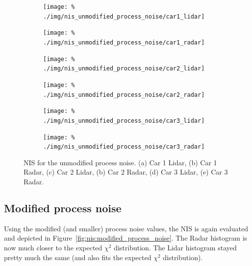 \documentclass{scrartcl}
\begin{document}
\begin{figure}[!ht]
	\centering
	\begin{subfigure}[c]{0.45\columnwidth}
		\texttt{[image: \%
			./img/nis\_unmodified\_process\_noise/car1\_lidar]}
	\end{subfigure}
	\begin{subfigure}[c]{0.45\columnwidth}
		\texttt{[image: \%
			./img/nis\_unmodified\_process\_noise/car1\_radar]}
	\end{subfigure}
	\begin{subfigure}[c]{0.45\columnwidth}
		\texttt{[image: \%
			./img/nis\_unmodified\_process\_noise/car2\_lidar]}
	\end{subfigure}
	\begin{subfigure}[c]{0.45\columnwidth}
		\texttt{[image: \%
			./img/nis\_unmodified\_process\_noise/car2\_radar]}
	\end{subfigure}
	\begin{subfigure}[c]{0.45\columnwidth}
		\texttt{[image: \%
			./img/nis\_unmodified\_process\_noise/car3\_lidar]}
	\end{subfigure}
	\begin{subfigure}[c]{0.45\columnwidth}
		\texttt{[image: \%
			./img/nis\_unmodified\_process\_noise/car3\_radar]}
	\end{subfigure}
	\caption{NIS for the unmodified process noise.
	(a) Car 1 Lidar, (b) Car 1 Radar,
	(c) Car 2 Lidar, (b) Car 2 Radar,
	(d) Car 3 Lidar, (e) Car 3 Radar.}
	\label{fig:nis:default_process_noise}
\end{figure}

\subsection{Modified process noise}
Using the modified (and smaller) process noise values, the NIS
is again evaluated and depicted in Figure~\ref{fig:nis:modified_process_noise}.
The Radar histogram is now much closer to the expected $\chi^2$ distribution.
The Lidar histogram stayed pretty much the same (and also fits
the expected $\chi^2$ distribution).
\end{document}
